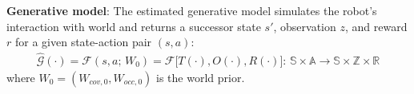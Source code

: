 \documentclass{article}
\newcommand{\ph}[1]{{\textbf{#1}:}} %
\begin{document}


\ph{Generative model} The estimated generative model simulates the robot's interaction with world and returns a successor state $s'$, observation $z$, and reward $r$ for a given state-action pair $(s,a)$:
\begin{align}
    \hat{\mathcal{G}}(\cdot) = \mathcal{F}(s, a; \, W_0) = \mathcal{F}\big[T(\cdot), O(\cdot), R(\cdot)\big]: \, \mathbb{S} \times \mathbb{A} \rightarrow \mathbb{S} \times \mathbb{Z} \times \mathbb{R} 
\end{align}
where $W_0 = (W_{cov,0}, W_{occ,0})$ is the world prior. 





\end{document}
